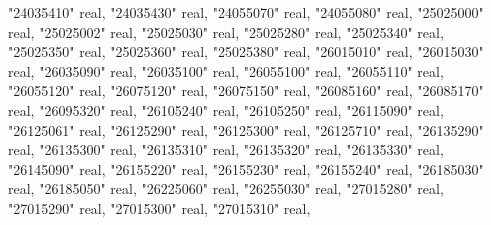 \documentclass[12pt,oneside]{reedthesis}
\newenvironment{Shaded}{\begin{snugshade}}{\end{snugshade}}
\newcommand{\DataTypeTok}[1]{\textcolor[rgb]{0.13,0.29,0.53}{#1}}
\newcommand{\NormalTok}[1]{#1}
\newcommand{\OtherTok}[1]{\textcolor[rgb]{0.56,0.35,0.01}{#1}}
\begin{document}
\begin{Shaded}
\begin{Highlighting}[]
     \OtherTok{"24035410"} \DataTypeTok{real}\NormalTok{, }\OtherTok{"24035430"} \DataTypeTok{real}\NormalTok{, }\OtherTok{"24055070"} \DataTypeTok{real}\NormalTok{, }\OtherTok{"24055080"} \DataTypeTok{real}\NormalTok{, }\OtherTok{"25025000"} \DataTypeTok{real}\NormalTok{, }\OtherTok{"25025002"} \DataTypeTok{real}\NormalTok{, }
     \OtherTok{"25025030"} \DataTypeTok{real}\NormalTok{, }\OtherTok{"25025280"} \DataTypeTok{real}\NormalTok{, }\OtherTok{"25025340"} \DataTypeTok{real}\NormalTok{, }\OtherTok{"25025350"} \DataTypeTok{real}\NormalTok{, }\OtherTok{"25025360"} \DataTypeTok{real}\NormalTok{, }\OtherTok{"25025380"} \DataTypeTok{real}\NormalTok{, }
     \OtherTok{"26015010"} \DataTypeTok{real}\NormalTok{, }\OtherTok{"26015030"} \DataTypeTok{real}\NormalTok{, }\OtherTok{"26035090"} \DataTypeTok{real}\NormalTok{, }\OtherTok{"26035100"} \DataTypeTok{real}\NormalTok{, }\OtherTok{"26055100"} \DataTypeTok{real}\NormalTok{, }\OtherTok{"26055110"} \DataTypeTok{real}\NormalTok{, }
     \OtherTok{"26055120"} \DataTypeTok{real}\NormalTok{, }\OtherTok{"26075120"} \DataTypeTok{real}\NormalTok{, }\OtherTok{"26075150"} \DataTypeTok{real}\NormalTok{, }\OtherTok{"26085160"} \DataTypeTok{real}\NormalTok{, }\OtherTok{"26085170"} \DataTypeTok{real}\NormalTok{, }\OtherTok{"26095320"} \DataTypeTok{real}\NormalTok{, }
     \OtherTok{"26105240"} \DataTypeTok{real}\NormalTok{, }\OtherTok{"26105250"} \DataTypeTok{real}\NormalTok{, }\OtherTok{"26115090"} \DataTypeTok{real}\NormalTok{, }\OtherTok{"26125061"} \DataTypeTok{real}\NormalTok{, }\OtherTok{"26125290"} \DataTypeTok{real}\NormalTok{, }\OtherTok{"26125300"} \DataTypeTok{real}\NormalTok{, }
     \OtherTok{"26125710"} \DataTypeTok{real}\NormalTok{, }\OtherTok{"26135290"} \DataTypeTok{real}\NormalTok{, }\OtherTok{"26135300"} \DataTypeTok{real}\NormalTok{, }\OtherTok{"26135310"} \DataTypeTok{real}\NormalTok{, }\OtherTok{"26135320"} \DataTypeTok{real}\NormalTok{, }\OtherTok{"26135330"} \DataTypeTok{real}\NormalTok{, }
     \OtherTok{"26145090"} \DataTypeTok{real}\NormalTok{, }\OtherTok{"26155220"} \DataTypeTok{real}\NormalTok{, }\OtherTok{"26155230"} \DataTypeTok{real}\NormalTok{, }\OtherTok{"26155240"} \DataTypeTok{real}\NormalTok{, }\OtherTok{"26185030"} \DataTypeTok{real}\NormalTok{, }\OtherTok{"26185050"} \DataTypeTok{real}\NormalTok{, }
     \OtherTok{"26225060"} \DataTypeTok{real}\NormalTok{, }\OtherTok{"26255030"} \DataTypeTok{real}\NormalTok{, }\OtherTok{"27015280"} \DataTypeTok{real}\NormalTok{, }\OtherTok{"27015290"} \DataTypeTok{real}\NormalTok{, }\OtherTok{"27015300"} \DataTypeTok{real}\NormalTok{, }\OtherTok{"27015310"} \DataTypeTok{real}\NormalTok{, }

\end{Highlighting}
\end{Shaded}
\end{document}
